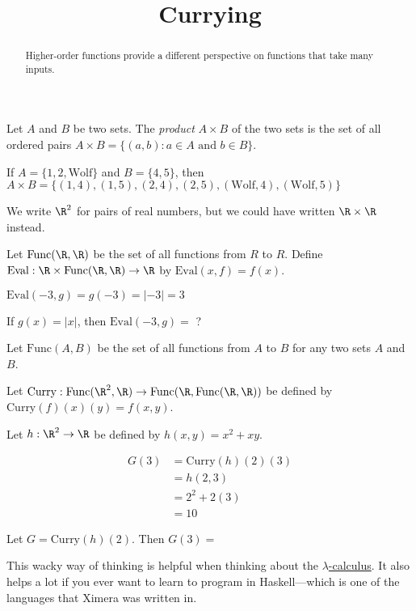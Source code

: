 \documentclass{ximera}
\title{Currying}
\begin{document}
\begin{abstract}
  Higher-order functions provide a different perspective on functions that take many inputs.
\end{abstract}
\maketitle
\begin{definition}
  Let $A$ and $B$ be two sets.  The \textit{product} $A\times B$ of
  the two sets is the set of all ordered pairs $A \times B = \{ (a,b):
  a \in A \text{ and } b \in B\}$.
\end{definition}

\begin{example}
  If $A = \{ 1,2,\text{Wolf}\}$ and $B = \{4,5\}$, then $A \times B =
  \{(1,4),(1,5),(2,4),(2,5),(\text{Wolf},4),(\text{Wolf},5)\}$
\end{example}

\begin{example}
  We write $\R^2$ for pairs of real numbers, but we could have written
  $\R \times \R$ instead.
\end{example}

\begin{question}
  Let $\text{Func}(\R,\R)$ be the set of all functions from $R$ to
  $R$.  Define $\text{Eval}: \R \times \text{Func}(\R,\R) \to \R$ by
  $\text{Eval}(x,f) = f(x)$.
\begin{solution}
\begin{hint}
	$\text{Eval}(-3,g) = g(-3)=|-3|=3$
\end{hint}
If $g(x) = |x|$, then $\text{Eval}(-3,g)=$ ?
\end{solution}
\end{question}

\begin{question}
  Let $\text{Func}(A,B)$ be the set of all functions from $A$ to $B$ for any two sets $A$ and $B$.  
  
  Let $\text{Curry}:\text{Func}(\R^2,\R) \to  \text{Func}(\R,\text{Func}(\R,\R))$ be defined by $\text{Curry}(f)(x)(y) = f(x,y)$.

  Let $h:\R^2 \to \R$ be defined by $h(x,y) = x^2 +xy$.  
  \begin{solution}
    \begin{hint}
      \begin{align*}
        G(3) &= \text{Curry}(h)(2)(3)\\
        &= h(2,3)\\
        &= 2^2+2(3)\\
        &=10
      \end{align*}
    \end{hint}
    Let $G = \text{Curry}(h)(2)$.  Then $G(3) =$ 
  \end{solution}
  
  This wacky way of thinking is helpful when thinking about the
  \href{http://en.wikipedia.org/wiki/Lambda_calculus}{$\lambda$-calculus}.
  It also helps a lot if you ever want to learn to program in
  Haskell---which is one of the languages that Ximera was written in.
  
\end{question}
\end{document}
